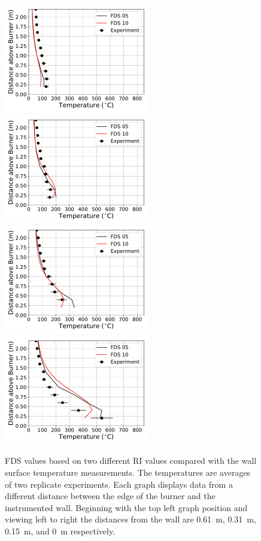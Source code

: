 \documentclass[twoside]{uocthesis}
\begin{document}
{\begin{figure}[ht!]
  \centering
  \includegraphics[width=2.5in]{../Figures/IWGB_NG_TC_Surface_Center_Avg_2D_RF_RI}
  \includegraphics[width=2.5in]{../Figures/IWGB_NG_TC_Surface_Center_Avg_1D_RF_RI}\\
  \includegraphics[width=2.5in]{../Figures/IWGB_NG_TC_Surface_Center_Avg_0p5D_RF_RI}
  \includegraphics[width=2.5in]{../Figures/IWGB_NG_TC_Surface_Center_Avg_0D_RF_RI}\\
  \caption[FDS values based on two different RI values compared with the wall surface temperature measurements.]{FDS values based on two different RI values compared with the wall surface temperature measurements. The temperatures are averages of two replicate experiments. Each graph displays data from a different distance between the edge of the burner and the instrumented wall.  Beginning with the top left graph position and viewing left to right the distances from the wall are 0.61~m, 0.31~m, 0.15~m, and 0~m respectively.}
  \label{FDS_Wall_Temp_IWGB_comp}
\end{figure}

}
\end{document}
